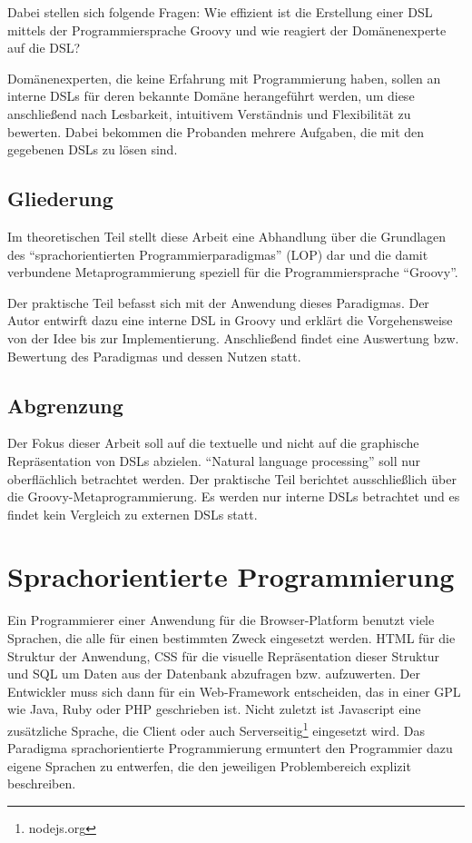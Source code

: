 \documentclass[11pt,english,ngerman, headsepline]{scrreprt}
\begin{document}
Dabei stellen sich folgende Fragen: Wie effizient ist die Erstellung einer DSL
mittels der Programmiersprache Groovy und wie reagiert der Domänenexperte auf
die DSL?

Domänenexperten, die keine Erfahrung mit Programmierung haben, sollen an
interne DSLs für deren bekannte Domäne herangeführt werden, um diese
anschließend nach Lesbarkeit, intuitivem Verständnis und Flexibilität zu
bewerten. Dabei bekommen die Probanden mehrere Aufgaben, die mit den
gegebenen DSLs zu lösen sind.
 
 
\section{Gliederung}

Im theoretischen Teil stellt diese Arbeit eine Abhandlung über die Grundlagen
des ``sprachorientierten Programmierparadigmas'' (LOP) dar und die damit
verbundene Metaprogrammierung speziell für die Programmiersprache ``Groovy''.

Der praktische Teil befasst sich mit der Anwendung dieses Paradigmas. Der Autor
entwirft dazu eine interne DSL in Groovy und erklärt die Vorgehensweise von der
Idee bis zur Implementierung.
Anschließend findet eine Auswertung bzw. Bewertung des Paradigmas und
dessen Nutzen statt.


\section{Abgrenzung}
Der Fokus dieser Arbeit soll auf die textuelle und nicht auf die graphische
Repräsentation von DSLs abzielen. “Natural language processing” soll nur
oberflächlich betrachtet werden. Der praktische Teil berichtet ausschließlich
über die Groovy-Metaprogrammierung. 
Es werden nur interne DSLs betrachtet und es findet kein Vergleich zu externen
DSLs statt.


\chapter{ Sprachorientierte Programmierung}

Ein Programmierer einer Anwendung für die Browser-Platform benutzt viele
Sprachen, die alle für einen bestimmten Zweck eingesetzt werden. HTML für die
Struktur der Anwendung, CSS für die visuelle Repräsentation dieser Struktur
und SQL um Daten aus der Datenbank abzufragen bzw. aufzuwerten. Der Entwickler muss sich dann für
ein Web-Framework entscheiden, das in einer GPL wie
Java, Ruby oder PHP geschrieben ist. Nicht zuletzt ist Javascript eine
zusätzliche Sprache, die Client oder auch Serverseitig\footnote{nodejs.org}
eingesetzt wird. 
Das Paradigma sprachorientierte Programmierung ermuntert den Programmier dazu
eigene Sprachen zu entwerfen, die den jeweiligen Problembereich explizit
beschreiben.
\end{document}
